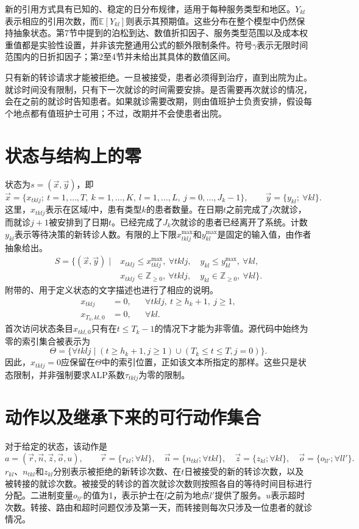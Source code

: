 \documentclass{article}
\begin{document}
新的引用方式具有已知的、稳定的日分布规律，适用于每种服务类型和地区。$Y_{kl}$表示相应的引用次数，而$\mathbb E[Y_{kl}]$则表示其预期值。这些分布在整个模型中仍然保持抽象状态。第7节中提到的泊松到达、数值折扣因子、服务类型范围以及成本权重值都是实验性设置，并非该完整通用公式的额外限制条件。符号$\gamma$表示无限时间范围内的日折扣因子；第2至4节并未给出其具体的数值区间。

只有新的转诊请求才能被拒绝。一旦被接受，患者必须得到治疗，直到出院为止。就诊时间没有限制，只有下一次就诊的时间需要安排。是否需要再次就诊的情况，会在之前的就诊时告知患者。如果就诊需要改期，则由值班护士负责安排，假设每个地点都有值班护士可用；不过，改期并不会使患者出院。

\section*{状态与结构上的零}
状态为$s=(\vec x,\vec y)$，即
\[
\vec x=\{x_{tklj};\ t=1,\ldots,T,\ k=1,\ldots,K,\ l=1,\ldots,L,\ j=0,\ldots,J_k-1\},
\qquad
\vec y=\{y_{kl};\ \forall kl\}.
\]
这里，$x_{tklj}$表示在区域$l$中，患有类型$k$的患者数量。在日期$t$之前完成了$j$次就诊，而就诊$j+1$被安排到了日期$t$。已经完成了$J_k$次就诊的患者已经离开了系统。计数$y_{kl}$表示等待决策的新转诊人数。有限的上下限$x^{\max}_{tklj}$和$y^{\max}_{kl}$是固定的输入值，由作者抽象给出。
\begin{equation}
\begin{split}
S=\{(\vec x,\vec y)\mid{}&x_{tklj}\leq x^{\max}_{tklj},\ \forall tklj,
\quad y_{kl}\leq y^{\max}_{kl},\ \forall kl,\\
&x_{tklj}\in\mathbb Z_{\geq0},\ \forall tklj,
\quad y_{kl}\in\mathbb Z_{\geq0},\ \forall kl\}.
\end{split}\tag{1}
\end{equation}
附带的、用于定义状态的文字描述也进行了相应的说明。
\begin{align*}
x_{tklj}&=0,&&\forall tklj,\ t\geq h_k+1,\ j\geq1,\\
x_{T_k,kl,0}&=0,&&\forall kl.
\end{align*}
首次访问状态条目$x_{tkl,0}$只有在$t\leq T_k-1$的情况下才能为非零值。源代码中始终为零的索引集合被表示为
\[
\Theta=\{\forall tklj\mid(t\geq h_k+1,j\geq1)\cup(T_k\leq t\leq T,j=0)\}.
\]
因此，$x_{tklj}=0$应保留在$\Theta$中的索引位置，正如该文本所指定的那样。这些只是状态限制，并非强制要求ALP系数$\tau_{tklj}$为零的限制。

\section*{动作以及继承下来的可行动作集合}
对于给定的状态，该动作是
\[
a=(\vec r,\vec n,\vec z,\vec o,u),\qquad
\vec r=\{r_{kl};\forall kl\},\quad
\vec n=\{n_{tkl};\forall tkl\},\quad
\vec z=\{z_{kl};\forall kl\},\quad
\vec o=\{o_{ll'};\forall ll'\}.
\]
$r_{kl}$、$n_{tkl}$和$z_{kl}$分别表示被拒绝的新转诊次数、在$t$日被接受的新的转诊次数，以及被转接的就诊次数。被接受的转诊的首次就诊次数则按照各自的等待时间目标进行分配。二进制变量$o_{ll'}$的值为1，表示护士在$l$之前为地点$l'$提供了服务。$u$表示超时次数。转接、路由和超时问题仅涉及第一天，而转接则每次只涉及一位患者的就诊情况。
\end{document}
